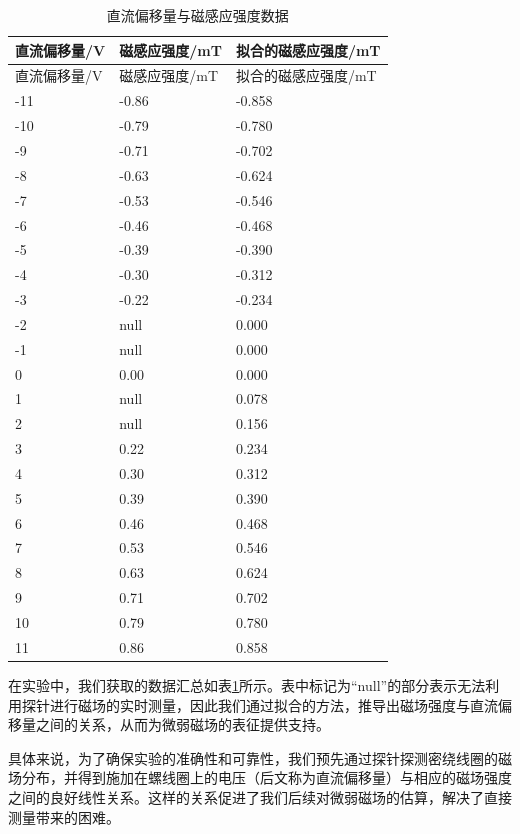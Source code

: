 \documentclass[12pt]{ctexart}
\numberwithin{equation}{section} %
\begin{document}
\begin{longtable}{p{2.5cm} p{3cm} p{3cm}} %
    \caption{直流偏移量与磁感应强度数据} \label{tab:拟合的磁感应强度} \\ 
    \toprule
    直流偏移量/V & 磁感应强度/mT & 拟合的磁感应强度/mT \\ 
    \midrule
    \endfirsthead %
    \toprule
    直流偏移量/V & 磁感应强度/mT & 拟合的磁感应强度/mT \\ 
    \midrule
    \endhead %
    \bottomrule
    \endfoot %
    \endlastfoot %
    
    -11 & -0.86 & -0.858 \\
    -10 & -0.79 & -0.780 \\
    -9  & -0.71 & -0.702 \\
    -8  & -0.63 & -0.624 \\
    -7  & -0.53 & -0.546 \\
    -6  & -0.46 & -0.468 \\
    -5  & -0.39 & -0.390 \\
    -4  & -0.30 & -0.312 \\
    -3  & -0.22 & -0.234 \\
    -2  & null  & 0.000 \\
    -1  & null  & 0.000 \\
     0  & 0.00  & 0.000 \\
     1  & null  & 0.078 \\
     2  & null  & 0.156 \\
     3  & 0.22  & 0.234 \\
     4  & 0.30  & 0.312 \\
     5  & 0.39  & 0.390 \\
     6  & 0.46  & 0.468 \\
     7  & 0.53  & 0.546 \\
     8  & 0.63  & 0.624 \\
     9  & 0.71  & 0.702 \\
    10  & 0.79  & 0.780 \\
    11  & 0.86  & 0.858 \\ 
    \bottomrule
\end{longtable}
在实验中，我们获取的数据汇总如表\ref{tab:拟合的磁感应强度}所示。表中标记为“null”的部分表示无法利用探针进行磁场的实时测量，因此我们通过拟合的方法，推导出磁场强度与直流偏移量之间的关系，从而为微弱磁场的表征提供支持。

具体来说，为了确保实验的准确性和可靠性，我们预先通过探针探测密绕线圈的磁场分布，并得到施加在螺线圈上的电压（后文称为直流偏移量）与相应的磁场强度之间的良好线性关系。这样的关系促进了我们后续对微弱磁场的估算，解决了直接测量带来的困难。
\end{document}

